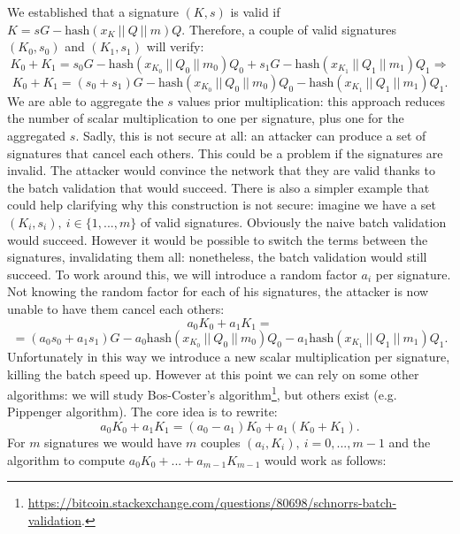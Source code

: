 \bigskip
\noindent
We established that a signature $(K, s)$ is valid if $K = sG - \text{hash}(x_K \ || \ Q \ || \ m)Q$. 
Therefore, a couple of valid signatures $(K_0, s_0)$ and $(K_1, s_1)$ will verify:
$$K_0 + K_1 = s_0G - \text{hash}(x_{K_0} \ || \ Q_0 \ || \ m_0)Q_0 + s_1G - \text{hash}(x_{K_1} \ || \ Q_1 \ || \ m_1)Q_1 \Longrightarrow
$$
$$K_0 + K_1 = (s_0 + s_1)G - \text{hash}(x_{K_0} \ || \ Q_0 \ || \ m_0)Q_0 - \text{hash}(x_{K_1} \ || \ Q_1 \ || \ m_1)Q_1.$$
We are able to aggregate the $s$ values prior multiplication: this approach reduces the number of scalar multiplication to one per signature, plus one for the aggregated $s$. Sadly, this is not secure at all: an attacker can produce a set of signatures that cancel each others. This could be a problem if the signatures are invalid. The attacker would convince the network that they are valid thanks to the batch validation that would succeed. There is also a simpler example that could help clarifying why this construction is not secure: imagine we have a set $(K_i, s_i), \ i \in \{1, ..., m\}$ of valid signatures. Obviously the naive batch validation would succeed. However it would be possible to switch the terms between the signatures, invalidating them all: nonetheless, the batch validation would still succeed. To work around this, we will introduce a random factor $a_i$ per signature. Not knowing the random factor for each of his signatures, the attacker is now unable to have them cancel each others:
$$a_0K_0 + a_1K_1 = $$
$$= (a_0s_0 + a_1s_1)G - a_0\text{hash}(x_{K_0} \ || \ Q_0 \ || \ m_0)Q_0 - a_1\text{hash}(x_{K_1} \ || \ Q_1 \ || \ m_1)Q_1.$$
Unfortunately in this way we introduce a new scalar multiplication per signature, killing the batch speed up. However at this point we can rely on some other algorithms: we will study Bos-Coster's algorithm\footnote{\url{https://bitcoin.stackexchange.com/questions/80698/schnorrs-batch-validation}.}, but others exist (e.g. Pippenger algorithm). The core idea is to rewrite:
$$a_0K_0 + a_1K_1 = (a_0 - a_1)K_0 + a_1(K_0 + K_1).$$
For $m$ signatures we would have $m$ couples $(a_i, K_i), \ i = 0, ..., m - 1$ and the algorithm to compute $a_0K_0 + ... + a_{m - 1}K_{m - 1}$ would work as follows:
